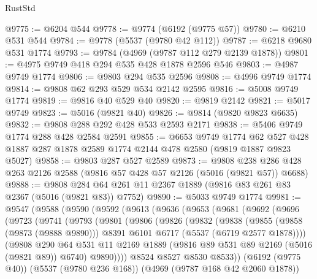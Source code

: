 \begin{lexlean}{RustStd}
\begin{coremodule}
@9775 := @6204 @544
@9778 := @9774 (@6192 (@9775 @57))
@9780 := @6210 @531 @544
@9784 := @9778 (@5537 (@9780 @42 @112))
@9787 := @6218 @9680 @531 @1774
@9793 := @9784 (@4969 (@9787 @112 @279 @2139 @1878))
@9801 := @4975 @9749 @418 @294 @535 @428 @1878 @2596 @546
@9803 := @4987 @9749 @1774
@9806 := @9803 @294 @535 @2596
@9808 := @4996 @9749 @1774
@9814 := @9808 @62 @293 @529 @534 @2142 @2595
@9816 := @5008 @9749 @1774
@9819 := @9816 @40 @529 @40
@9820 := @9819 @2142
@9821 := @5017 @9749
@9823 := @5016 (@9821 @40)
@9826 := @9814 (@9820 @9823 @6635)
@9832 := @9808 @288 @292 @428 @533 @2593 @2171
@9838 := @5406 @9749 @1774 @288 @428 @2584 @2591
@9855 := @6653
    @9749
    @1774
    @62
    @527
    @428
    @1887
    @287
    @1878
    @2589
    @1774
    @2144
    @478
    @2580
    (@9819 @1887 @9823 @5027)
@9858 := @9803 @287 @527 @2589
@9873 := @9808 @238 @286 @428 @263 @2126 @2588 (@9816 @57 @428 @57 @2126 (@5016 (@9821 @57)) @6688)
@9888 := @9808 @284 @64 @261 @11 @2367 @1889 (@9816 @83 @261 @83 @2367 (@5016 (@9821 @83)) @7752)
@9890 := @5033 @9749 @1774
@9981 := @9547
    (@9588
      (@9590
        (@9592
          (@9613
            (@9636
              (@9653
                (@9681
                  (@9692
                    (@9696
                      (@9723
                        (@9741
                          (@9793
                            (@9801
                              (@9806
                                (@9826
                                  (@9832
                                    (@9838
                                      (@9855
                                        (@9858 (@9873 (@9888 @9890)))
                                        @8391
                                        @6101
                                        @6717
                                        (@5537 (@6719 @2577 @1878))))
                                    (@9808
                                      @290
                                      @64
                                      @531
                                      @11
                                      @2169
                                      @1889
                                      (@9816 @89 @531 @89 @2169 (@5016 (@9821 @89)) @6740)
                                      @9890))))
                              @8524
                              @8527
                              @8530
                              @8533))
                          (@6192 (@9775 @40))
                          (@5537 (@9780 @236 @168))
                          (@4969 (@9787 @168 @42 @2060 @1878))

\end{coremodule}
\end{lexlean}
